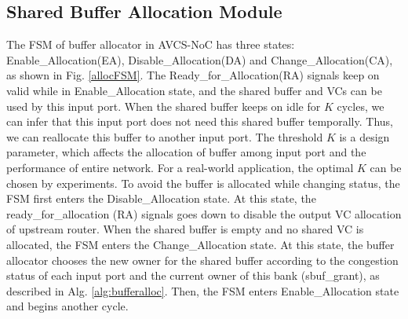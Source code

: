 \documentclass[10pt,conference]{IEEEtran}
\begin{document}
\subsection{Shared Buffer Allocation Module}\label{bufmanage}
The FSM of buffer allocator in AVCS-NoC has three states: Enable\_Allocation(EA), Disable\_Allocation(DA) and Change\_Allocation(CA), as shown in Fig. \ref{allocFSM}. The Ready\_for\_Allocation(RA) signals keep on valid while in Enable\_Allocation state, and the shared buffer and VCs can be used by this input port. When the shared buffer keeps on idle for $K$ cycles, we can infer that this input port does not need this shared buffer temporally. Thus, we can reallocate this buffer to another input port. The threshold $K$ is a design parameter, which affects the allocation of buffer among input port and the performance of entire network. For a real-world application, the optimal $K$ can be chosen by experiments. To avoid the buffer is allocated while changing status, the FSM first enters the Disable\_Allocation state. At this state, the ready\_for\_allocation (RA) signals goes down to disable the output VC allocation of upstream router. When the shared buffer is empty and no shared VC is allocated, the FSM enters the Change\_Allocation state. At this state, the buffer allocator chooses the new owner for the shared buffer according to the congestion status of each input port and the current owner of this bank (sbuf\_grant), as described in Alg. \ref{alg:bufferalloc}. Then, the FSM enters Enable\_Allocation state and begins another cycle.

\end{document}
